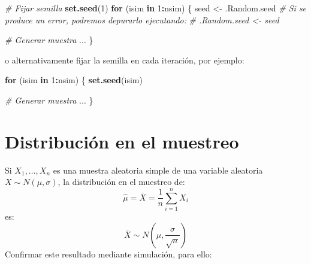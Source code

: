 \documentclass[]{book}
\newenvironment{Shaded}{\begin{snugshade}}{\end{snugshade}}
\newcommand{\KeywordTok}[1]{\textcolor[rgb]{0.13,0.29,0.53}{\textbf{#1}}}
\newcommand{\DecValTok}[1]{\textcolor[rgb]{0.00,0.00,0.81}{#1}}
\newcommand{\StringTok}[1]{\textcolor[rgb]{0.31,0.60,0.02}{#1}}
\newcommand{\CommentTok}[1]{\textcolor[rgb]{0.56,0.35,0.01}{\textit{#1}}}
\newcommand{\ControlFlowTok}[1]{\textcolor[rgb]{0.13,0.29,0.53}{\textbf{#1}}}
\newcommand{\OperatorTok}[1]{\textcolor[rgb]{0.81,0.36,0.00}{\textbf{#1}}}
\newcommand{\NormalTok}[1]{#1}
\theoremstyle{definition}
\theoremstyle{definition}
\theoremstyle{definition}
\theoremstyle{remark}
\let\BeginKnitrBlock\begin \let\EndKnitrBlock\end
\begin{document}
\begin{Shaded}
\begin{Highlighting}[]
\CommentTok{# Fijar semilla}
\KeywordTok{set.seed}\NormalTok{(}\DecValTok{1}\NormalTok{)}
\ControlFlowTok{for}\NormalTok{ (isim }\ControlFlowTok{in} \DecValTok{1}\OperatorTok{:}\NormalTok{nsim) \{}
\NormalTok{  seed <-}\StringTok{ }\NormalTok{.Random.seed}
  \CommentTok{# Si se produce un error, podremos depurarlo ejecutando:}
  \CommentTok{#  .Random.seed <- seed}
  
  \CommentTok{# Generar muestra}
\NormalTok{  ...}
\NormalTok{\}}
\end{Highlighting}
\end{Shaded}

o alternativamente fijar la semilla en cada iteración, por ejemplo:

\begin{Shaded}
\begin{Highlighting}[]
\ControlFlowTok{for}\NormalTok{ (isim }\ControlFlowTok{in} \DecValTok{1}\OperatorTok{:}\NormalTok{nsim) \{}
  \KeywordTok{set.seed}\NormalTok{(isim)}

  \CommentTok{# Generar muestra}
\NormalTok{  ...}
\NormalTok{\}}
\end{Highlighting}
\end{Shaded}

\section{Distribución en el muestreo}\label{distribucion-en-el-muestreo}

\BeginKnitrBlock{exercise}
\protect\hypertarget{exr:unnamed-chunk-4}{}{\label{exr:unnamed-chunk-4} }
\EndKnitrBlock{exercise}

Si \(X_{1},\ldots,X_{n}\) es una muestra aleatoria simple de una
variable aleatoria \(X \sim N\left( \mu, \sigma \right)\), la
distribución en el muestreo de:
\[\hat{\mu}=\overline{X}=\dfrac{1}{n}\sum_{i=1}^{n}X_{i}\] es:
\[\overline{X} \sim N\left(  \mu,\dfrac{\sigma}{\sqrt{n}}\right)\]
Confirmar este resultado mediante simulación, para ello:
\end{document}
